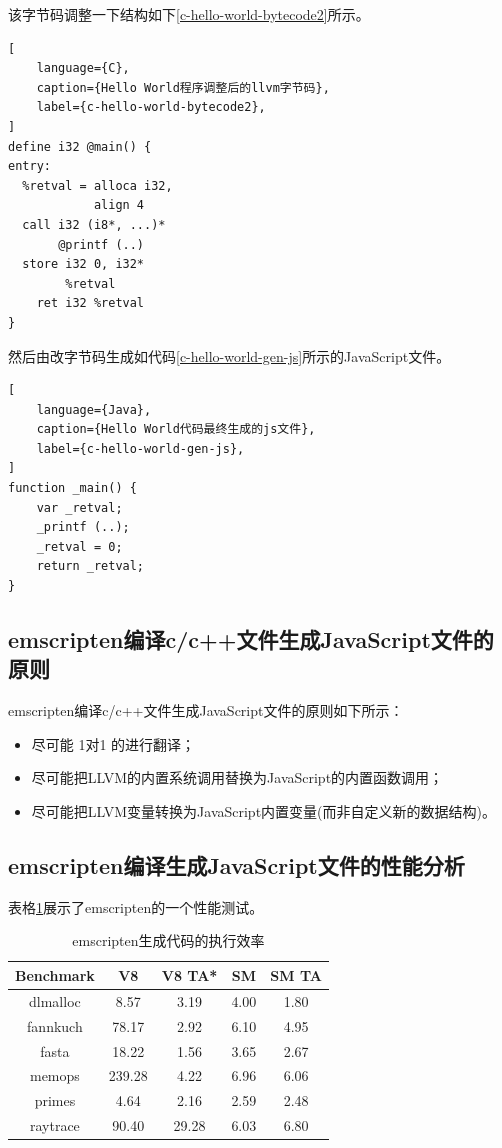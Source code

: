 该字节码调整一下结构如下\ref{c-hello-world-bytecode2}所示。

\begin{lstlisting}[
    language={C},
    caption={Hello World程序调整后的llvm字节码},
    label={c-hello-world-bytecode2},
]
define i32 @main() {
entry:
  %retval = alloca i32,
            align 4
  call i32 (i8*, ...)*
       @printf (..)
  store i32 0, i32*
        %retval
    ret i32 %retval 
}
\end{lstlisting}

然后由改字节码生成如代码\ref{c-hello-world-gen-js}所示的JavaScript文件。

\begin{lstlisting}[
    language={Java},
    caption={Hello World代码最终生成的js文件},
    label={c-hello-world-gen-js},
]
function _main() {
    var _retval;
    _printf (..);
    _retval = 0;
    return _retval;
}
\end{lstlisting}

\subsection{emscripten编译c/c++文件生成JavaScript文件的原则}

emscripten编译c/c++文件生成JavaScript文件的原则如下所示：

\begin{itemize}[itemindent=2em]
    \item 尽可能 1对1 的进行翻译；
    \item 尽可能把LLVM的内置系统调用替换为JavaScript的内置函数调用；
    \item 尽可能把LLVM变量转换为JavaScript内置变量(而非自定义新的数据结构)。
\end{itemize}

\subsection{emscripten编译生成JavaScript文件的性能分析}

表格\ref{emscripten-performance-sample}展示了emscripten的一个性能测试。
\begin{table}
    \centering
    \caption{emscripten生成代码的执行效率}
    \label{emscripten-performance-sample}
    \begin{tabular}{c|c|c|c|c}
        \hline
        Benchmark & V8 & V8 TA* & SM &SM TA \\ \hline \hline
        dlmalloc & 8.57 & 3.19 & 4.00 & 1.80 \\ \hline
        fannkuch & 78.17 & 2.92 & 6.10 & 4.95 \\ \hline
        fasta & 18.22 & 1.56 & 3.65 & 2.67 \\ \hline
        memops & 239.28 & 4.22 & 6.96 & 6.06 \\ \hline
        primes & 4.64 & 2.16 & 2.59 & 2.48 \\ \hline
        raytrace & 90.40 & 29.28 & 6.03 & 6.80 \\ \hline
    \end{tabular}
\end{table}

